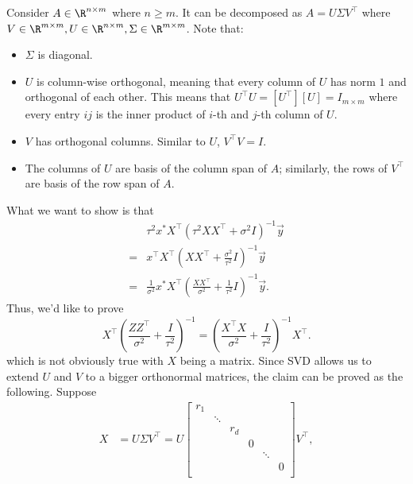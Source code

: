 Consider $A \in \R^{n \times m}$ where $n \geq m$. It can be decomposed as $A = U \Sigma V^\top$ where $V \in \R^{m \times m}, U \in \R^{n \times m}, \Sigma \in \R^{m \times m}$. Note that: 
\begin{itemize}
	\item $\Sigma$ is diagonal.
	\item $U$ is column-wise orthogonal, meaning that every column of $U$ has norm $1$ and orthogonal of each other. This means that $U^\top U = [U^\top][U] = I_{m \times m}$ where every entry $ij$ is the inner product of $i$-th and $j$-th column of $U$.
	\item $V$ has orthogonal columns. Similar to $U$, $V^\top V = I$. 
	\item The columns of $U$ are basis of the column span of $A$; similarly, the rows of $V^\top$ are basis of the row span of $A$.
\end{itemize}
What we want to show is that 
\begin{equation*} \label{eq1}
	\begin{split}
		& \tau^2 x^* X^\top (\tau^2 X X^\top + \sigma^2 I)^{-1} \overrightarrow{y} \\
		= & x^\top X^\top (XX^\top + \frac{\sigma^2}{\tau^2}I)^{-1} \overrightarrow{y} \\
		= & \frac{1}{\sigma^2} x^* X^\top (\frac{XX^\top}{\sigma^2} + \frac{1}{\tau^2} I)^{-1} \overrightarrow{y}.
	\end{split}
\end{equation*}
Thus, we'd like to prove \begin{equation*} \label{eu_eqn}
	X^\top (\frac{ZZ^\top}{\sigma^2} + \frac{I}{\tau^2})^{-1} 
	= (\frac{X^\top X}{\sigma^2} + \frac{I}{\tau^2})^{-1} X^\top.
\end{equation*}
which is not obviously true with $X$ being a matrix. Since SVD allows us to extend $U$ and $V$ to a bigger orthonormal matrices, the claim can be proved as the following. Suppose
\begin{align*} \label{eu_eqn}
	X & = U \Sigma V^\top  = U
	\begin{bmatrix}
		r_1 & & & & &  \\
		& \ddots & & & & \\
		& & r_d & & &  \\
		& & & 0 & & \\
		& & & & \ddots & \\
		& & & & & 0 \\
	\end{bmatrix}
	V^\top,
\end{align*}
